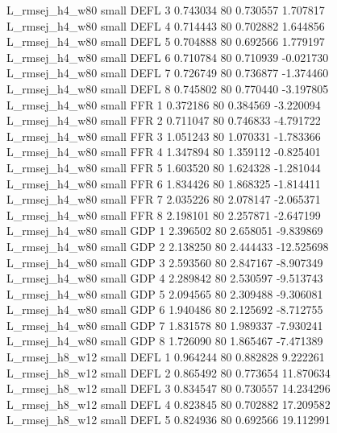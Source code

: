 L_rmsej_h4_w80      small     DEFL                 3 0.743034 80       0.730557           1.707817
L_rmsej_h4_w80      small     DEFL                 4 0.714443 80       0.702882           1.644856
L_rmsej_h4_w80      small     DEFL                 5 0.704888 80       0.692566           1.779197
L_rmsej_h4_w80      small     DEFL                 6 0.710784 80       0.710939          -0.021730
L_rmsej_h4_w80      small     DEFL                 7 0.726749 80       0.736877          -1.374460
L_rmsej_h4_w80      small     DEFL                 8 0.745802 80       0.770440          -3.197805
L_rmsej_h4_w80      small      FFR                 1 0.372186 80       0.384569          -3.220094
L_rmsej_h4_w80      small      FFR                 2 0.711047 80       0.746833          -4.791722
L_rmsej_h4_w80      small      FFR                 3 1.051243 80       1.070331          -1.783366
L_rmsej_h4_w80      small      FFR                 4 1.347894 80       1.359112          -0.825401
L_rmsej_h4_w80      small      FFR                 5 1.603520 80       1.624328          -1.281044
L_rmsej_h4_w80      small      FFR                 6 1.834426 80       1.868325          -1.814411
L_rmsej_h4_w80      small      FFR                 7 2.035226 80       2.078147          -2.065371
L_rmsej_h4_w80      small      FFR                 8 2.198101 80       2.257871          -2.647199
L_rmsej_h4_w80      small      GDP                 1 2.396502 80       2.658051          -9.839869
L_rmsej_h4_w80      small      GDP                 2 2.138250 80       2.444433         -12.525698
L_rmsej_h4_w80      small      GDP                 3 2.593560 80       2.847167          -8.907349
L_rmsej_h4_w80      small      GDP                 4 2.289842 80       2.530597          -9.513743
L_rmsej_h4_w80      small      GDP                 5 2.094565 80       2.309488          -9.306081
L_rmsej_h4_w80      small      GDP                 6 1.940486 80       2.125692          -8.712755
L_rmsej_h4_w80      small      GDP                 7 1.831578 80       1.989337          -7.930241
L_rmsej_h4_w80      small      GDP                 8 1.726090 80       1.865467          -7.471389
L_rmsej_h8_w12      small     DEFL                 1 0.964244 80       0.882828           9.222261
L_rmsej_h8_w12      small     DEFL                 2 0.865492 80       0.773654          11.870634
L_rmsej_h8_w12      small     DEFL                 3 0.834547 80       0.730557          14.234296
L_rmsej_h8_w12      small     DEFL                 4 0.823845 80       0.702882          17.209582
L_rmsej_h8_w12      small     DEFL                 5 0.824936 80       0.692566          19.112991
